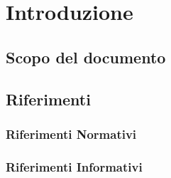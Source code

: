 \documentclass[PianoDiProgetto.tex]{subfiles}
\begin{document}
\chapter{Introduzione}

	\section{Scopo del documento}
	
	\scopoProdotto
	
	\glossExpl
	
	\section{Riferimenti}
		\subsection{Riferimenti Normativi}
		
		\subsection{Riferimenti Informativi}
\end{document}
